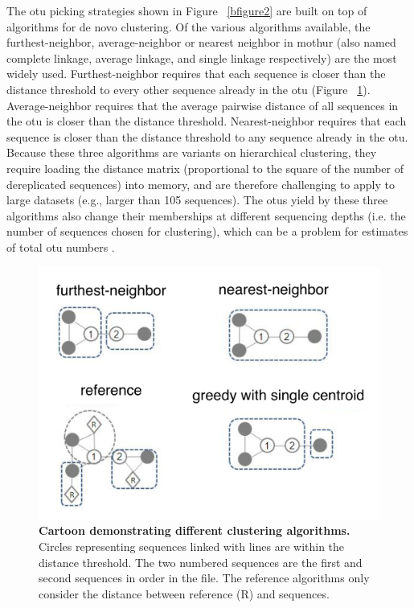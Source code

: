 The \gls{otu} picking strategies shown in Figure ~\ref{bfigure2} are built on top of
algorithms for de novo clustering. Of the various algorithms available, the furthest-neighbor,
average-neighbor or nearest neighbor in mothur \cite{Schloss2005, Schloss2009} (also named
complete linkage, average linkage, and single linkage respectively) are the most widely used.
Furthest-neighbor requires that each sequence is closer than the distance threshold to
every other sequence already in the \gls{otu} (Figure ~\ref{bfigure3}). Average-neighbor requires
that the average pairwise distance of all sequences in the \gls{otu} is closer than the
distance threshold. Nearest-neighbor requires that each sequence is closer than the
distance threshold to any sequence already in the \gls{otu}. Because these three algorithms
are variants on hierarchical clustering, they require loading the distance matrix
(proportional to the square of the number of dereplicated sequences) into memory, and are
therefore challenging to apply to large datasets (e.g., larger than 105 sequences). The
\gls{otu}s yield by these three algorithms also change their memberships at different sequencing depths
(i.e. the number of sequences chosen for clustering), which can be a problem for estimates of total
\gls{otu} numbers \cite{Roesch2007}.

\begin{figure}[htbp]
\includegraphics[width=0.75\columnwidth]{chapter_book_figures/Figure_3.jpg}
\caption[Cartoon demonstrating different clustering algorithms]{\textbf{Cartoon demonstrating different clustering algorithms.}
Circles representing sequences linked with lines are within the distance threshold.
The two numbered sequences are the first and second sequences in order in the file.
The reference algorithms only consider the distance between reference (R) and sequences.}
\label{bfigure3}
\end{figure}

